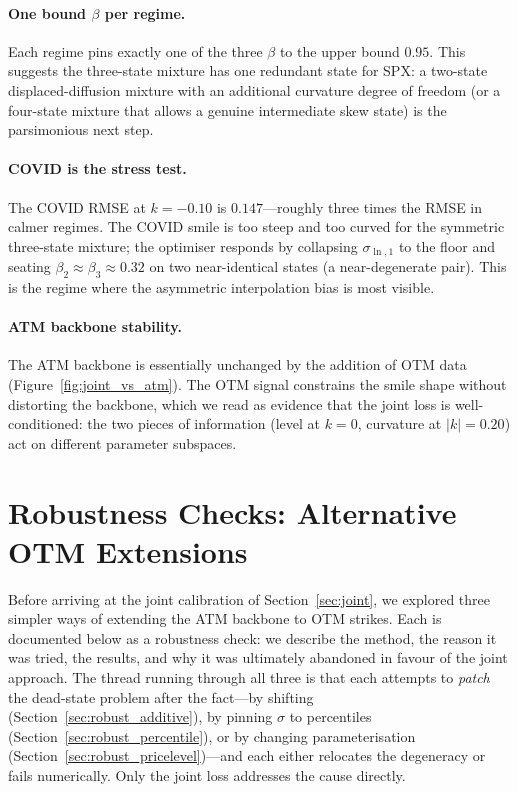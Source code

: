 \documentclass[12pt]{article}
\begin{document}
\paragraph{One bound $\beta$ per regime.} Each regime pins exactly one of the three $\beta$ to the upper bound $0.95$. This suggests the three-state mixture has one redundant state for SPX: a two-state displaced-diffusion mixture with an additional curvature degree of freedom (or a four-state mixture that allows a genuine intermediate skew state) is the parsimonious next step.

\paragraph{COVID is the stress test.} The COVID RMSE at $k=-0.10$ is $0.147$---roughly three times the RMSE in calmer regimes. The COVID smile is too steep and too curved for the symmetric three-state mixture; the optimiser responds by collapsing $\sigma_{\ln,1}$ to the floor and seating $\beta_2 \approx \beta_3 \approx 0.32$ on two near-identical states (a near-degenerate pair). This is the regime where the asymmetric interpolation bias is most visible.

\paragraph{ATM backbone stability.} The ATM backbone is essentially unchanged by the addition of OTM data (Figure~\ref{fig:joint_vs_atm}). The OTM signal constrains the smile shape without distorting the backbone, which we read as evidence that the joint loss is well-conditioned: the two pieces of information (level at $k=0$, curvature at $|k|=0.20$) act on different parameter subspaces.


\section{Robustness Checks: Alternative OTM Extensions}
\label{sec:robust}

Before arriving at the joint calibration of Section~\ref{sec:joint}, we explored three simpler ways of extending the ATM backbone to OTM strikes. Each is documented below as a robustness check: we describe the method, the reason it was tried, the results, and why it was ultimately abandoned in favour of the joint approach. The thread running through all three is that each attempts to \emph{patch} the dead-state problem after the fact---by shifting (Section~\ref{sec:robust_additive}), by pinning $\sigma$ to percentiles (Section~\ref{sec:robust_percentile}), or by changing parameterisation (Section~\ref{sec:robust_pricelevel})---and each either relocates the degeneracy or fails numerically. Only the joint loss addresses the cause directly.
\end{document}
